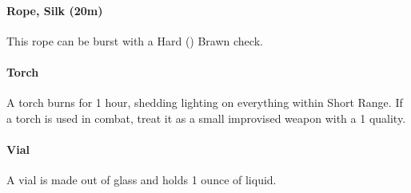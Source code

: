 \begin{multicols}{2}
\paragraph{Rope, Silk (20m)} \label{advitm:rope_silk}
This rope can be burst with a Hard (\difficulty\difficulty\difficulty\setback)
Brawn check.

\paragraph{Torch} \label{advitm:torch}
A torch burns for 1 hour, shedding lighting on
everything within Short Range.
If a torch is used in combat, treat it as a small
improvised weapon with a  1 quality.

\paragraph{Vial} \label{advitm:vial}
A vial is made out of glass and holds 1 ounce of liquid.

\end{multicols}
\hrulefill
